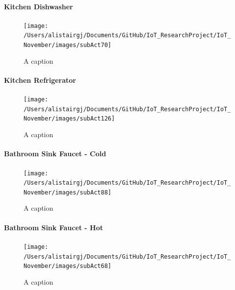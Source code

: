\documentclass[11pt,]{article}
\let\oldparagraph\paragraph
\renewcommand{\paragraph}[1]{\oldparagraph{#1}\mbox{}}
\begin{document}
\hypertarget{kitchen-dishwasher}{%
\paragraph{Kitchen Dishwasher}\label{kitchen-dishwasher}}

\begin{figure}[H]

{\centering \texttt{[image: /Users/alistairgj/Documents/GitHub/IoT\_ResearchProject/IoT\_November/images/subAct70]} 

}

\caption{A caption}\label{fig:subAct70}
\end{figure}

\hypertarget{kitchen-refrigerator}{%
\paragraph{Kitchen Refrigerator}\label{kitchen-refrigerator}}

\begin{figure}[H]

{\centering \texttt{[image: /Users/alistairgj/Documents/GitHub/IoT\_ResearchProject/IoT\_November/images/subAct126]} 

}

\caption{A caption}\label{fig:subAct126}
\end{figure}

\hypertarget{bathroom-sink-faucet---cold}{%
\paragraph{Bathroom Sink Faucet -
Cold}\label{bathroom-sink-faucet---cold}}

\begin{figure}[H]

{\centering \texttt{[image: /Users/alistairgj/Documents/GitHub/IoT\_ResearchProject/IoT\_November/images/subAct88]} 

}

\caption{A caption}\label{fig:subAct88}
\end{figure}

\hypertarget{bathroom-sink-faucet---hot}{%
\paragraph{Bathroom Sink Faucet -
Hot}\label{bathroom-sink-faucet---hot}}

\begin{figure}[H]

{\centering \texttt{[image: /Users/alistairgj/Documents/GitHub/IoT\_ResearchProject/IoT\_November/images/subAct68]} 

}

\caption{A caption}\label{fig:subAct68}
\end{figure}
\end{document}
